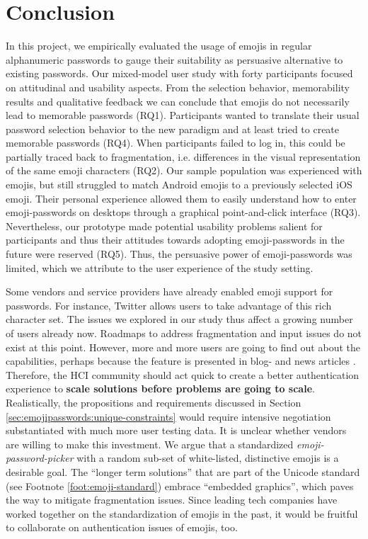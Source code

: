 \section{Conclusion}
In this project, we empirically evaluated the usage of emojis in regular alphanumeric passwords to gauge their suitability as persuasive alternative to existing passwords. Our mixed-model user study with forty participants focused on attitudinal and usability aspects. From the selection behavior, memorability results and qualitative feedback we can conclude that emojis do not necessarily lead to memorable passwords (RQ1). Participants wanted to translate their usual password selection behavior to the new paradigm and at least tried to create memorable passwords (RQ4). When participants failed to log in, this could be partially traced back to fragmentation, i.e. differences in the visual representation of the same emoji characters (RQ2). Our sample population was experienced with emojis, but still struggled to match Android emojis to a previously selected iOS emoji. Their personal experience allowed them to easily understand how to enter emoji-passwords on desktops through a graphical point-and-click interface (RQ3). Nevertheless, our prototype made potential usability problems salient for participants and thus their attitudes towards adopting emoji-passwords in the future were reserved (RQ5). Thus, the persuasive power of emoji-passwords was limited, which we attribute to the user experience of the study setting. 

Some vendors and service providers have already enabled emoji support for passwords. For instance, Twitter allows users to take advantage of this rich character set. The issues we explored in our study thus affect a growing number of users already now. Roadmaps to address fragmentation and input issues do not exist at this point. However, more and more users are going to find out about the capabilities, perhaps because the feature is presented in blog- and news articles \cite{Dashinsky2015NoEmojisInPWs}. Therefore, the HCI community should act quick to create a better authentication experience to \textbf{scale solutions before problems are going to scale}. 
Realistically, the propositions and requirements discussed in Section \ref{sec:emojipasswords:unique-constraints} would require intensive negotiation substantiated with much more user testing data.  It is unclear whether vendors are willing to make this investment. We argue that a standardized \textit{emoji-password-picker} with a random sub-set of white-listed, distinctive emojis is a desirable goal. The ``longer term solutions'' that are part of the Unicode standard (see Footnote \ref{foot:emoji-standard}) embrace ``embedded graphics'', which paves the way to mitigate fragmentation issues. Since leading tech companies have worked together on the standardization of emojis in the past, it would be fruitful to collaborate on authentication issues of emojis, too.

